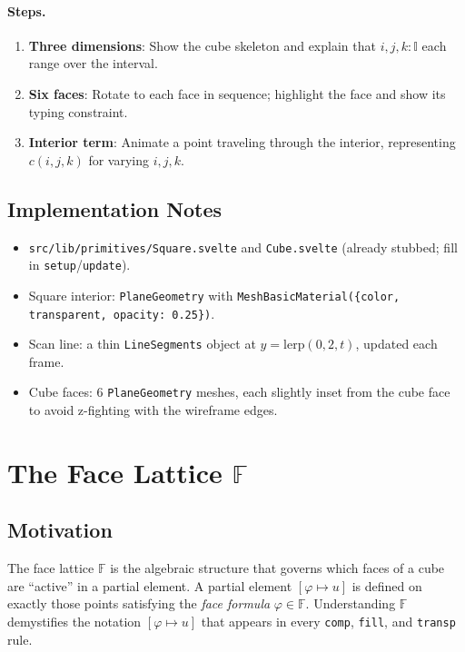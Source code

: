 \documentclass[11pt,a4paper]{article}
\begin{document}
\paragraph{Steps.}
\begin{enumerate}
  \item \textbf{Three dimensions}: Show the cube skeleton and explain that
    $i,j,k : \mathbb{I}$ each range over the interval.
  \item \textbf{Six faces}: Rotate to each face in sequence; highlight the face
    and show its typing constraint.
  \item \textbf{Interior term}: Animate a point traveling through the interior,
    representing $c(i,j,k)$ for varying $i,j,k$.
\end{enumerate}

\subsection{Implementation Notes}

\begin{itemize}
  \item \texttt{src/lib/primitives/Square.svelte} and \texttt{Cube.svelte}
    (already stubbed; fill in \texttt{setup}/\texttt{update}).
  \item Square interior: \texttt{PlaneGeometry} with
    \texttt{MeshBasicMaterial(\{color, transparent, opacity: 0.25\})}.
  \item Scan line: a thin \texttt{LineSegments} object at $y = \mathrm{lerp}(0,
    2, t)$, updated each frame.
  \item Cube faces: 6 \texttt{PlaneGeometry} meshes, each slightly inset from
    the cube face to avoid z-fighting with the wireframe edges.
\end{itemize}

\section{The Face Lattice $\mathbb{F}$}

\subsection{Motivation}

The face lattice $\mathbb{F}$ is the algebraic structure that governs which
faces of a cube are ``active'' in a partial element. A partial element
$[{\varphi \mapsto u}]$ is defined on exactly those points satisfying the
\emph{face formula} $\varphi \in \mathbb{F}$. Understanding $\mathbb{F}$
demystifies the notation $[\varphi \mapsto u]$ that appears in every
\texttt{comp}, \texttt{fill}, and \texttt{transp} rule.
\end{document}

